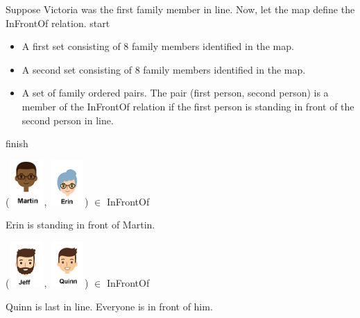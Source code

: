 \documentclass{ximera}
\begin{document}
\begin{exercise}

Suppose Victoria was the first family member in line. Now, let the map define the InFrontOf relation.
start
  \begin{definition}
    \begin{itemize}
    \item A first set consisting of 8 family members identified in the map.
    \item A second set consisting of 8 family members identified in the map.
    \item A set of family ordered pairs. The pair (first person, second person) is a member of the InFrontOf relation if the first person is standing in front of the second person in line.
    \end{itemize}
  \end{definition}
finish

 ({\includegraphics[width=50px,height=65px]{pics/people/martin.png}}, {\includegraphics[width=50px,height=65px]{pics/people/erin.png}}) $\in$ InFrontOf 

  \begin{multipleChoice}
  \end{multipleChoice}
  \begin{feedback}
Erin is standing in front of Martin.
  \end{feedback}
\end{exercise}




\begin{exercise}

 ({\includegraphics[width=50px,height=65px]{pics/people/jeff.png}}, {\includegraphics[width=50px,height=65px]{pics/people/quinn.png}}) $\in$ InFrontOf 

  \begin{multipleChoice}
  \end{multipleChoice}
  \begin{feedback}
Quinn is last in line. Everyone is in front of him.
  \end{feedback}
\end{exercise}
\end{document}
